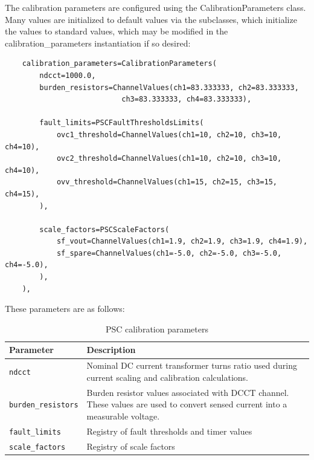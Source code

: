 
\newpage

\label{sec:cal-parameters}
\par\medskip
The calibration parameters are configured using the CalibrationParameters class. Many values are initialized to default values via the subclasses, which initialize the values to standard values, which may be modified in the calibration\_parameters instantiation if so desired:
\begin{verbatim}
	calibration_parameters=CalibrationParameters(
		ndcct=1000.0,
		burden_resistors=ChannelValues(ch1=83.333333, ch2=83.333333,
					       ch3=83.333333, ch4=83.333333),

		fault_limits=PSCFaultThresholdsLimits(
			ovc1_threshold=ChannelValues(ch1=10, ch2=10, ch3=10, ch4=10),
			ovc2_threshold=ChannelValues(ch1=10, ch2=10, ch3=10, ch4=10),
			ovv_threshold=ChannelValues(ch1=15, ch2=15, ch3=15, ch4=15),
		),

		scale_factors=PSCScaleFactors(
			sf_vout=ChannelValues(ch1=1.9, ch2=1.9, ch3=1.9, ch4=1.9),
			sf_spare=ChannelValues(ch1=-5.0, ch2=-5.0, ch3=-5.0, ch4=-5.0),
		),
	),
\end{verbatim}
These parameters are as follows:\\
\begin{table}[ht]
	\centering
	\begin{tabular}{p{4cm}p{10cm}}
		\toprule
		\textbf{Parameter} & \textbf{Description} \\
		\midrule
		\texttt{ndcct} &
		Nominal DC current transformer turns ratio used during current scaling and calibration calculations. \\

		\texttt{burden\_resistors} &
		Burden resistor values associated with DCCT channel. These values are used to convert sensed current into a measurable voltage. \\

		\texttt{fault\_limits} &
		Registry of fault thresholds and timer values\\

		\texttt{scale\_factors} &
		Registry of scale factors\\

		\bottomrule
	\end{tabular}
	\caption{PSC calibration parameters}
	\label{tab:psc-calibration-parameters}
\end{table}

